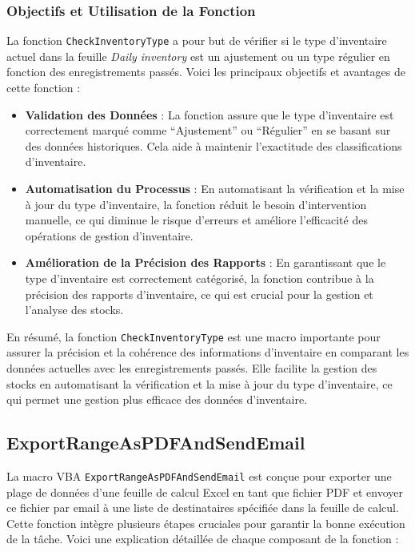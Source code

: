 \documentclass[a4paper, oneside, 12pt, final]{extreport}
\begin{document}
\subsubsection{Objectifs et Utilisation de la Fonction}

La fonction \texttt{CheckInventoryType} a pour but de vérifier si le type d'inventaire actuel dans la feuille \textit{Daily inventory} est un ajustement ou un type régulier en fonction des enregistrements passés. Voici les principaux objectifs et avantages de cette fonction :

\begin{itemize}
    \item \textbf{Validation des Données} : La fonction assure que le type d'inventaire est correctement marqué comme ``Ajustement'' ou ``Régulier'' en se basant sur des données historiques. Cela aide à maintenir l'exactitude des classifications d'inventaire.
    \item \textbf{Automatisation du Processus} : En automatisant la vérification et la mise à jour du type d'inventaire, la fonction réduit le besoin d'intervention manuelle, ce qui diminue le risque d'erreurs et améliore l'efficacité des opérations de gestion d'inventaire.
    \item \textbf{Amélioration de la Précision des Rapports} : En garantissant que le type d'inventaire est correctement catégorisé, la fonction contribue à la précision des rapports d'inventaire, ce qui est crucial pour la gestion et l'analyse des stocks.
\end{itemize}

En résumé, la fonction \texttt{CheckInventoryType} est une macro importante pour assurer la précision et la cohérence des informations d'inventaire en comparant les données actuelles avec les enregistrements passés. Elle facilite la gestion des stocks en automatisant la vérification et la mise à jour du type d'inventaire, ce qui permet une gestion plus efficace des données d'inventaire.
\subsection{ExportRangeAsPDFAndSendEmail}

La macro VBA \texttt{ExportRangeAsPDFAndSendEmail} est conçue pour exporter une plage de données d'une feuille de calcul Excel en tant que fichier PDF et envoyer ce fichier par email à une liste de destinataires spécifiée dans la feuille de calcul. Cette fonction intègre plusieurs étapes cruciales pour garantir la bonne exécution de la tâche. Voici une explication détaillée de chaque composant de la fonction :
\end{document}
